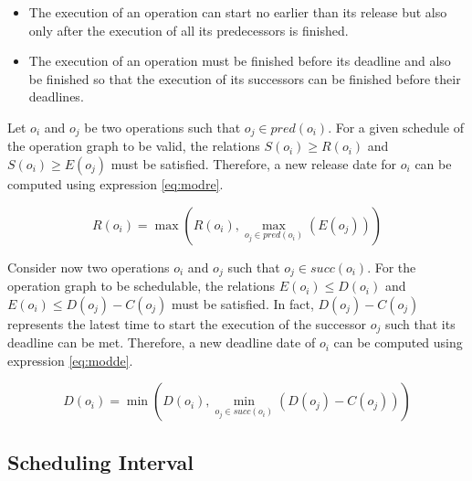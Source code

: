 \begin{itemize}

\item The execution of an operation can start no earlier than its release but also only after the execution of all its predecessors is finished.

\item The execution of an operation must be finished before its deadline and also be finished so that the execution of its successors can be finished before their deadlines.

\end{itemize}

Let $o_i$ and $o_j$ be two operations such that $o_j \in pred(o_i)$. For a given schedule of the operation graph to be valid, the relations $S(o_i) \geq R(o_i)$ and $S(o_i) \geq E(o_j)$ must be satisfied. Therefore, a new release date for $o_i$ can be computed using expression \ref{eq:modre}.

\begin{equation} 
R(o_i) = \max(R(o_i), \max_{o_j \in pred(o_i)}(E(o_j)))
\label{eq:modre}
\end{equation}

Consider now two operations $o_i$ and $o_j$ such that $o_j \in succ(o_i)$. For the operation graph to be schedulable, the relations $E(o_i) \leq D(o_i)$ and $E(o_i) \leq D(o_j) - C(o_j)$ must be satisfied. In fact, $D(o_j) - C(o_j)$ represents the latest time to start the execution of the successor $o_j$ such that its deadline can be met. Therefore, a new deadline date of $o_i$ can be computed using expression \ref{eq:modde}.

\begin{equation} 
D(o_i) = \min(D(o_i), \min_{o_j \in succ(o_i)}(D(o_j) - C(o_j)))
\label{eq:modde}
\end{equation}

\subsection{Scheduling Interval}

